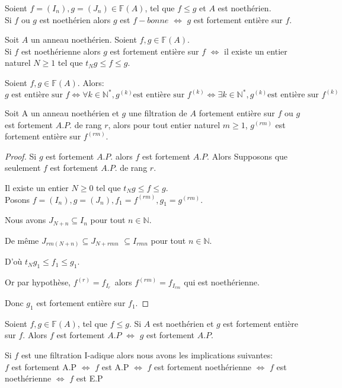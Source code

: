 \begin{moncorollaire}
	Soient $f=(I_n), g=(J_n) \in \mathbb{F}(A)$, tel que $f \leqslant g$ et $A$ est noethérien.\\ Si $f$ ou $g$ est noethérien alors $g$ est $f-bonne$ $\Longleftrightarrow$ $g$ est fortement entière sur $f$.
\end{moncorollaire}
\begin{maproposition}
	Soit $A$ un anneau noethérien. Soient $f,g \in \mathbb{F}(A)$.\\ Si $f$ est noethérienne alors $g$ est fortement entière sur $f$ $\Longleftrightarrow$ il existe un entier naturel $N \geqslant 1$ tel que $t_{N}g \leqslant f \leqslant g$.
\end{maproposition}
\begin{maproposition}
	Soient $f,g \in \mathbb{F}(A)$. Alors:
	\[ g \text{ est entière sur } f \Longleftrightarrow \forall k \in \mathbb{N}^{*}, g^{(k)} \text{est entière sur } f^{(k)} \Longleftrightarrow \exists k \in \mathbb{N}^{*}, g^{(k)} \text{est entière sur } f^{(k)} \]
\end{maproposition}
\begin{maproposition}
	Soit A un anneau noethérien et $g$ une filtration de $A$ fortement entière sur $f$ ou $g$ est fortement $A.P.$ de rang $r$, alors pour tout entier naturel $m \geqslant 1$, $g^{(rm)}$ est fortement entière sur $f^{(rm)}$.  
\end{maproposition}
\begin{proof}
	Si $g$ est fortement $A.P.$ alors $f$ est fortement $A.P.$
	Alors Supposons que seulement $f$ est fortement $A.P.$ de rang $r.$
	
	Il existe un entier $N\geq 0$ tel que $t_{N}g\leq f\leq g.$\\
	Posons $f=(I_{n}),g=(J_{n}),f_{1}=f^{(rm)},g_{1}=g^{(rm)}.$
	
	Nous avons $J_{N+n}\subseteq I_{n}$ pour tout $n\in \mathbb{N}.$
	
	De même $J_{rm(N+n)}\subseteq J_{N+rmn}$ $\subseteq I_{rmn}$  pour tout $n\in \mathbb{N}.$
	
	D'où $t_{N}g_{1}\leq f_{1}\leq g_{1}.$
	
	Or par hypothèse, $f^{(r)}=f_{I_{r}\text{ }}$alors $f^{(rm)}=f_{I_{rm}}$ qui est noethérienne.
	
	Donc $g_{1}$ est fortement entière sur $f_{1}.$
	
\end{proof}
\begin{moncorollaire}
	Soient $f,g \in \mathbb{F}(A)$, tel que $f \leqslant g$. Si $A$ est noethérien et $g$ est fortement entière sur $f$. Alors $f$ est fortement $A.P$ $\Longleftrightarrow$ $g$ est fortement $A.P.$
\end{moncorollaire}
\begin{maproposition}
	Si $f$ est une filtration I-adique alors nous avons les implications suivantes:\\
	$f$ est fortement A.P $\Longleftrightarrow $ $f$ est A.P $\Longleftrightarrow $ $f$ est fortement noethérienne $\Longleftrightarrow $ $f$ est noethérienne $\Longleftrightarrow $ $f$ est E.P
\end{maproposition}


